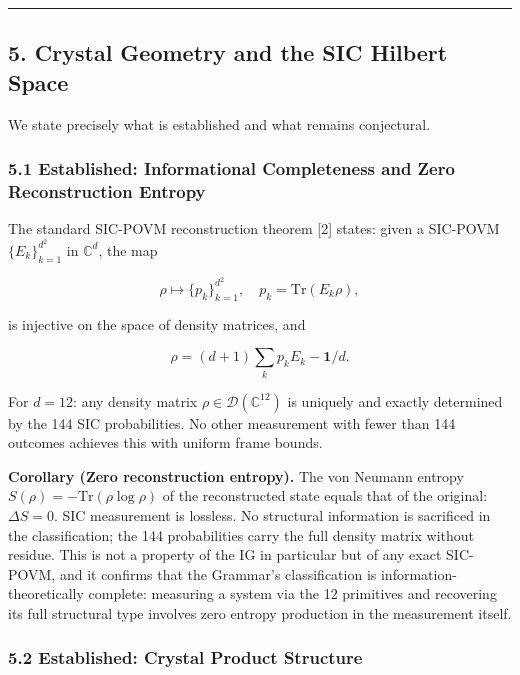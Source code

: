\documentclass[12pt,a4paper]{article}
\begin{document}
\begin{center}\rule{0.5\linewidth}{0.5pt}\end{center}

\hypertarget{crystal-geometry-and-the-sic-hilbert-space}{%
\subsection{5. Crystal Geometry and the SIC Hilbert
Space}\label{crystal-geometry-and-the-sic-hilbert-space}}

We state precisely what is established and what remains conjectural.

\hypertarget{established-informational-completeness-and-zero-reconstruction-entropy}{%
\subsubsection{5.1 Established: Informational Completeness and Zero
Reconstruction
Entropy}\label{established-informational-completeness-and-zero-reconstruction-entropy}}

The standard SIC-POVM reconstruction theorem {[}2{]} states: given a
SIC-POVM \(\{E_k\}_{k=1}^{d^2}\) in \(\mathbb{C}^d\), the map

\[\rho \mapsto \{p_k\}_{k=1}^{d^2}, \quad p_k = \mathrm{Tr}(E_k \rho),\]

is injective on the space of density matrices, and

\[\rho = (d+1)\sum_k p_k E_k - \mathbf{1}/d.\]

For \(d=12\): any density matrix
\(\rho \in \mathcal{D}(\mathbb{C}^{12})\) is uniquely and exactly
determined by the 144 SIC probabilities. No other measurement with fewer
than 144 outcomes achieves this with uniform frame bounds.

\textbf{Corollary (Zero reconstruction entropy).} The von Neumann
entropy \(S(\rho) = -\mathrm{Tr}(\rho \log \rho)\) of the reconstructed
state equals that of the original: \(\Delta S = 0\). SIC measurement is
lossless. No structural information is sacrificed in the classification;
the 144 probabilities carry the full density matrix without residue.
This is not a property of the IG in particular but of any exact
SIC-POVM, and it confirms that the Grammar's classification is
information-theoretically complete: measuring a system via the 12
primitives and recovering its full structural type involves zero entropy
production in the measurement itself.

\hypertarget{established-crystal-product-structure}{%
\subsubsection{5.2 Established: Crystal Product
Structure}\label{established-crystal-product-structure}}
\end{document}
